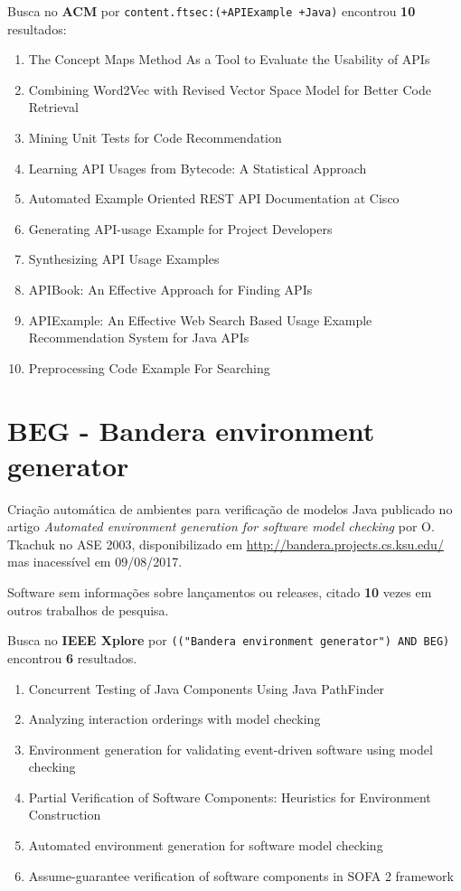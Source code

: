 Busca no {\bf ACM} por
\texttt{content.ftsec:(+APIExample +Java)}
encontrou {\bf 10}
resultados:

\begin{enumerate}
\item The Concept Maps Method As a Tool to Evaluate the Usability of APIs
\item Combining Word2Vec with Revised Vector Space Model for Better Code Retrieval
\item Mining Unit Tests for Code Recommendation
\item Learning API Usages from Bytecode: A Statistical Approach
\item Automated Example Oriented REST API Documentation at Cisco
\item Generating API-usage Example for Project Developers
\item Synthesizing API Usage Examples
\item APIBook: An Effective Approach for Finding APIs
\item APIExample: An Effective Web Search Based Usage Example Recommendation System for Java APIs
\item Preprocessing Code Example For Searching
\end{enumerate}

\section{BEG - Bandera environment generator}

Criação automática de ambientes para verificação de modelos Java
publicado no artigo {\it Automated environment generation for software model checking}
por O. Tkachuk
no ASE 2003,
disponibilizado em \url{http://bandera.projects.cs.ksu.edu/}
mas inacessível em 09/08/2017.

Software sem informações sobre lançamentos ou releases,
citado {\bf 10} vezes em outros trabalhos de pesquisa.

Busca no {\bf IEEE Xplore} por
\texttt{(("Bandera environment generator") AND BEG)}
encontrou {\bf 6}
resultados.

\begin{enumerate}
\item Concurrent Testing of Java Components Using Java PathFinder
\item Analyzing interaction orderings with model checking
\item Environment generation for validating event-driven software using model checking
\item Partial Verification of Software Components: Heuristics for Environment Construction
\item Automated environment generation for software model checking
\item Assume-guarantee verification of software components in SOFA 2 framework
\end{enumerate}

